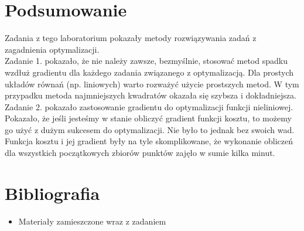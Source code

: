 \documentclass{article}
\begin{document}
\section{Podsumowanie}
Zadania z tego laboratorium pokazały metody rozwiązywania zadań z zagadnienia optymalizacji.
\\
Zadanie 1. pokazało, że nie należy zawsze, bezmyślnie, stosować metod spadku wzdłuż gradientu dla każdego zadania związanego z optymalizacją. Dla prostych układów równań (np. liniowych) warto rozważyć użycie prostszych metod. W tym przypadku metoda najmniejszych kwadratów okazała się szybsza i dokładniejsza.
\\
Zadanie 2. pokazało zastosowanie gradientu do optymalizacji funkcji nieliniowej. Pokazało, że jeśli jesteśmy w stanie obliczyć gradient funkcji kosztu, to możemy go użyć z dużym sukcesem do optymalizacji. Nie było to jednak bez swoich wad. Funkcja kosztu i jej gradient były na tyle skomplikowane, że wykonanie obliczeń dla wszystkich początkowych zbiorów punktów zajęło w sumie kilka minut.
\section{Bibliografia}
\begin{itemize}
\item Materiały zamieszczone wraz z zadaniem
\end{itemize}
\end{document}
